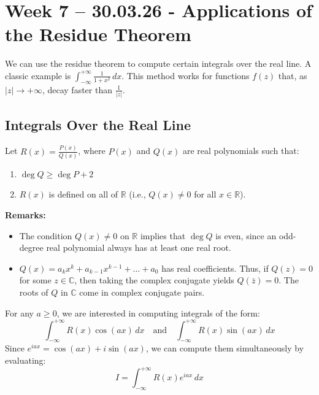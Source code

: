 \section{Week 7 -- 30.03.26 - Applications of the Residue Theorem}

We can use the residue theorem to compute certain integrals over the real line. A classic example is $\int_{-\infty}^{+\infty} \frac{1}{1+x^2} \, dx$. This method works for functions $f(z)$ that, as $|z| \to +\infty$, decay faster than $\frac{1}{|z|}$.

\subsection{Integrals Over the Real Line}
Let $R(x) = \frac{P(x)}{Q(x)}$, where $P(x)$ and $Q(x)$ are real polynomials such that:
\begin{enumerate}
    \item $\deg Q \ge \deg P + 2$
    \item $R(x)$ is defined on all of $\mathbb{R}$ (i.e., $Q(x) \neq 0$ for all $x \in \mathbb{R}$).
\end{enumerate}

\noindent \textbf{Remarks:}
\begin{itemize}
    \item The condition $Q(x) \neq 0$ on $\mathbb{R}$ implies that $\deg Q$ is even, since an odd-degree real polynomial always has at least one real root.
    \item $Q(x) = a_k x^k + a_{k-1} x^{k-1} + \dots + a_0$ has real coefficients. Thus, if $Q(z) = 0$ for some $z \in \mathbb{C}$, then taking the complex conjugate yields $Q(\bar{z}) = 0$. The roots of $Q$ in $\mathbb{C}$ come in complex conjugate pairs.
\end{itemize}

For any $a \ge 0$, we are interested in computing integrals of the form:
\begin{equation*}
\int_{-\infty}^{+\infty} R(x)\cos(ax) \, dx \quad \text{and} \quad \int_{-\infty}^{+\infty} R(x)\sin(ax) \, dx
\end{equation*}
Since $e^{iax} = \cos(ax) + i\sin(ax)$, we can compute them simultaneously by evaluating:
\begin{equation}
I = \int_{-\infty}^{+\infty} R(x)e^{iax} \, dx
\end{equation}

